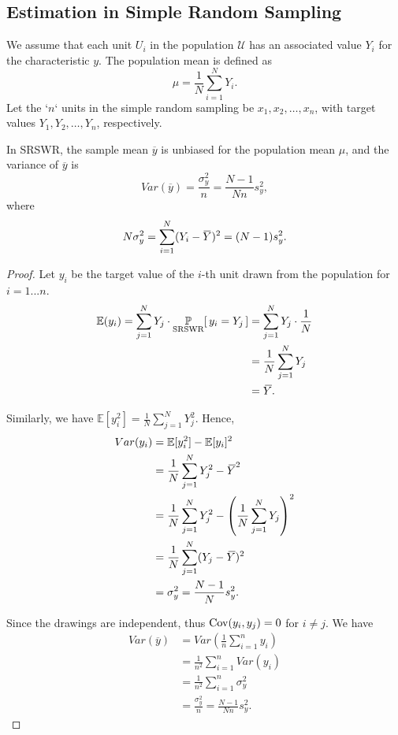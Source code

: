 \subsection{Estimation in Simple Random Sampling}

We assume that each unit $U_i$ in the population $\mathcal{U}$ has an 
associated value $Y_i$ for the characteristic $y$. The population mean is defined as
\begin{equation}
    \mu = \frac{1}{N} \sum_{i=1}^N Y_i.
\end{equation}
Let the `$n$` units in the simple random sampling 
be $x_1, x_2, \ldots, x_n$, with target values $Y_1, Y_2, \ldots, Y_n$, respectively.

\begin{theorem}
    In SRSWR, the sample mean $\overline{y}$ is unbiased for the population mean $\mu$, 
    and the variance of $\overline{y}$ is
    \begin{equation}
        Var(\overline{y}) = \frac{\sigma^2_y}{n} = \frac{N - 1}{Nn} s^2_y,
    \end{equation}
    where 
    \begin{equation}
        N \sigma^2_y = \sum_{i=1}^N (Y_i - \ols{Y})^2 = (N - 1) s^2_y.
    \end{equation}
\end{theorem}
\begin{proof}
    Let $y_i$ be the target value of the $i$-th unit drawn from the population for $i=1...n$.
    \begin{align*}
        \mathbb{E}(y_i) = \sum^N_{j=1} Y_j \cdot \uprob[\text{SRSWR}]{y_i = Y_j}
        &= \sum^N_{j=1} Y_j \cdot \frac{1}{N} \\
        &= \frac{1}{N} \sum^N_{j=1} Y_j \\
        &= \olsi{Y}.
    \end{align*}

    Similarly, we have $\mathbb{E}[y_i^2] = \frac{1}{N} \sum^N_{j=1} Y_j^2$. Hence,
    \begin{align*}
        Var(y_i) &= \mathbb{E}[y_i^2] - \mathbb{E}[y_i]^2\\
        &= \frac{1}{N} \sum^N_{j=1} Y_j^2 - \,\overline{\!{Y}}^2\\
        &= \frac{1}{N} \sum^N_{j=1} Y_j^2 - \left( \frac{1}{N} \sum^N_{j=1} Y_j \right)^2\\
        &= \frac{1}{N} \sum^N_{j=1} (Y_j - \,\overline{\!{Y}})^2\\
        &= \sigma^2_y = \frac{N - 1}{N} s^2_y.
    \end{align*}

    Since the drawings are independent, thus 
    $\operatorname*{Cov}(y_i, y_j) = 0$ for $i \neq j$. We have
    \begin{align*}
        Var(\overline{y}) &= Var \left( \frac{1}{n} \sum^n_{i=1} y_i \right)\\
        &= \frac{1}{n^2} \sum^n_{i=1} Var(y_i)\\
        &= \frac{1}{n^2} \sum^n_{i=1} \sigma^2_y\\
        &= \frac{\sigma^2_y}{n}
        = \frac{N - 1}{Nn} s^2_y.
    \end{align*}
\end{proof}

